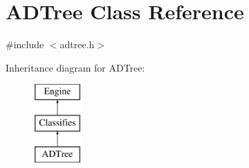 \hypertarget{classADTree}{
\section{ADTree Class Reference}
\label{classADTree}
}


{\ttfamily \#include $<$adtree.h$>$}

Inheritance diagram for ADTree:\begin{figure}[H]
\begin{center}
\leavevmode
\includegraphics[height=3cm]{classADTree}
\end{center}
\end{figure}
